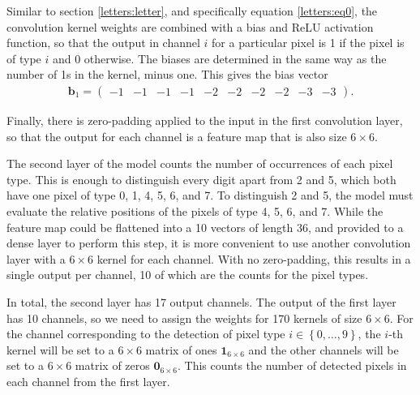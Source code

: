 \documentclass{somasmsc}
\begin{document}
Similar to section \ref{letters:letter}, and specifically equation \ref{letters:eq0}, the convolution kernel weights are combined with a bias and ReLU activation function, so that the output in channel $i$ for a particular pixel is 1 if the pixel is of type $i$ and 0 otherwise. The biases are determined in the same way as the number of 1s in the kernel, minus one. This gives the bias vector
\begin{align*}
    \pmb{b}_1 =
    \begin{pmatrix}
        -1 & -1 & -1 & -1 & -2 & -2 & -2 & -2 & -3 & -3
    \end{pmatrix}.
\end{align*}

Finally, there is zero-padding applied to the input in the first convolution layer, so that the output for each channel is a feature map that is also size $6 \times 6$.

The second layer of the model counts the number of occurrences of each pixel type. This is enough to distinguish every digit apart from 2 and 5, which both have one pixel of type 0, 1, 4, 5, 6, and 7. To distinguish 2 and 5, the model must evaluate the relative positions of the pixels of type 4, 5, 6, and 7. While the feature map could be flattened into a 10 vectors of length 36, and provided to a dense layer to perform this step, it is more convenient to use another convolution layer with a $6 \times 6$ kernel for each channel. With no zero-padding, this results in a single output per channel, 10 of which are the counts for the pixel types.

In total, the second layer has 17 output channels. The output of the first layer has 10 channels, so we need to assign the weights for 170 kernels of size $6 \times 6$. For the channel corresponding to the detection of pixel type $i \in \left\{0, \dots, 9\right\}$, the $i$-th kernel will be set to a $6 \times 6$ matrix of ones $\mathbf{1}_{6 \times 6}$ and the other channels will be set to a $6 \times 6$ matrix of zeros $\mathbf{0}_{6 \times 6}$. This counts the number of detected pixels in each channel from the first layer.
\end{document}
